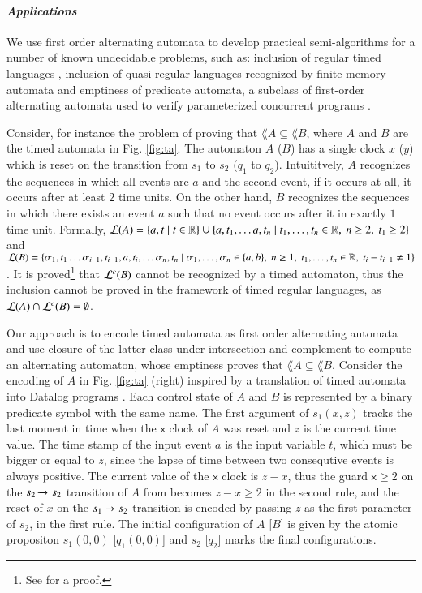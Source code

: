\paragraph{\em Applications}
We use first order alternating automata to develop practical
semi-algorithms for a number of known undecidable problems, such as:
inclusion of regular timed languages \cite{AlurDill94}, inclusion of
quasi-regular languages recognized by finite-memory automata
\cite{KaminskiFrancez94} and emptiness of predicate automata, a
subclass of first-order alternating automata used to verify
parameterized concurrent programs \cite{Farzan15,Farzan16}.

Consider, for instance the problem of proving that $\lang{A} \subseteq
\lang{B}$, where $A$ and $B$ are the timed automata in
Fig. \ref{fig:ta}. The automaton $A$ ($B$) has a single clock $x$
($y$) which is reset on the transition from $s_1$ to $s_2$ ($q_1$ to
$q_2$). Intuititvely, $A$ recognizes the sequences in which all events
are $a$ and the second event, if it occurs at all, it occurs after at
least $2$ time units. On the other hand, $B$ recognizes the sequences
in which there exists an event $a$ such that no event occurs after it
in exactly $1$ time unit. Formally, ${\mathcal L}({A}) = \{ a,t \mid t \in
  {\bf \mathbb{R}} \} \cup \{ a, t_1, \ldots a, t_n \mid t_1, \ldots, t_n \in
  {\bf \mathbb{R}},~ n \geq 2,~ t_1 \geq 2 \}$ and ${\mathcal L}({B}) = \{ \sigma_1, t_1
  \ldots \sigma_{i-1}, t_{i-1}, a, t_i, \ldots \sigma_n, t_n \mid
  \sigma_1, \ldots, \sigma_n \in \{ a,b \},~ n \geq 1,~ t_1, \ldots,
  t_n \in {\bf \mathbb{R}},~ t_i-t_{i-1} \neq 1 \}$. It is proved\footnote{See
  \cite[Theorem 1]{AlurMadhusudan04} for a proof.}  that ${\mathcal L}^c({B})$
cannot be recognized by a timed automaton, thus the inclusion cannot
be proved in the framework of timed regular languages, as ${\mathcal L}({A})
\cap {\mathcal L}^c({B}) = \emptyset$.

Our approach is to encode timed automata as first order alternating
automata and use closure of the latter class under intersection and
complement to compute an alternating automaton, whose emptiness proves
that $\lang{A} \subseteq \lang{B}$. Consider the encoding of $A$ in
Fig. \ref{fig:ta} (right) inspired by a translation of timed automata
into Datalog programs \cite{Fribourg98}.  Each control state of $A$
and $B$ is represented by a binary predicate symbol with the same
name. The first argument of $s_1(x,z)$ tracks the last moment in time
when the $\mathsf{x}$ clock of $A$ was reset and $z$ is the current
time value. The time stamp of the input event $a$ is the input
variable $t$, which must be bigger or equal to $z$, since the lapse of
time between two consequtive events is always positive. The current
value of the $\mathsf{x}$ clock is $z-x$, thus the guard $\mathsf{x}
\geq 2$ on the $s_2 \xrightarrow{{\scriptscriptstyle }}_{{\scriptstyle }} s_2$ transition of $A$ from becomes
$z-x \geq 2$ in the second rule, and the reset of $x$ on the $s_1
\xrightarrow{{\scriptscriptstyle }}_{{\scriptstyle }} s_2$ transition is encoded by passing $z$ as the first
parameter of $s_2$, in the first rule. The initial configuration of
$A$ [$B$] is given by the atomic propositon $s_1(0,0)$ [$q_1(0,0)$]
and $s_2$ [$q_2$] marks the final configurations.

